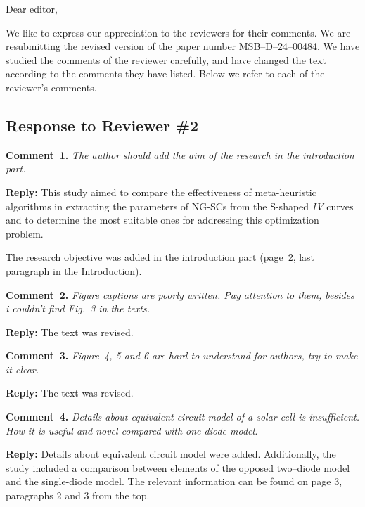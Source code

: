 \documentclass[a4paper,fleqn]{cas-sc}
\begin{document}
\shorttitle{}


Dear editor,

We like to express our appreciation to the reviewers for their comments.
We are resubmitting the revised version of the paper number MSB--D--24--00484.
We have studied the comments of the reviewer carefully, and have changed the text according to the comments they
have listed.
Below we refer to each of the reviewer’s comments.


\subsection*{Response to Reviewer \#2 }

\noindent
\textcolor[rgb]{0.00,0.50,1.00}{\textbf{Comment~1.}}
\emph{The author should add the aim of the research in the introduction part.}

\noindent
\textcolor[rgb]{0.51,0.00,0.00}{\textbf{Reply:}}
This study aimed to compare the effectiveness of meta-heuristic algorithms in extracting the parameters of NG-SCs from the S-shaped \emph{IV} curves
and to determine the most suitable ones for addressing this optimization problem. 

The research objective was added in the introduction part (page~2, last paragraph in the Introduction).


\vspace{1cm}
\noindent
\textcolor[rgb]{0.00,0.50,1.00}{\textbf{Comment~2.}}
\emph{Figure captions are poorly written. Pay attention to them, besides i couldn't find Fig.~3 in the texts.}

\noindent
\textcolor[rgb]{0.51,0.00,0.00}{\textbf{Reply:}}
The text was revised.

\vspace{1cm}
\noindent
\textcolor[rgb]{0.00,0.50,1.00}{\textbf{Comment~3.}}
\emph{Figure~4, 5 and 6 are hard to understand for authors, try to make it clear.}

\noindent
\textcolor[rgb]{0.51,0.00,0.00}{\textbf{Reply:}}
The text was revised.

\vspace{1cm}
\noindent
\textcolor[rgb]{0.00,0.50,1.00}{\textbf{Comment~4.}}
\emph{Details about equivalent circuit model of a solar cell is insufficient.
How it is useful and novel compared with one diode model.}



\noindent
\textcolor[rgb]{0.51,0.00,0.00}{\textbf{Reply:}}
Details about equivalent circuit model were added. 
Additionally, the study included a comparison between elements of 
the opposed two--diode model and the single-diode model.
The relevant information can be found on page 3, paragraphs 2 and 3 from the top.
\end{document}
